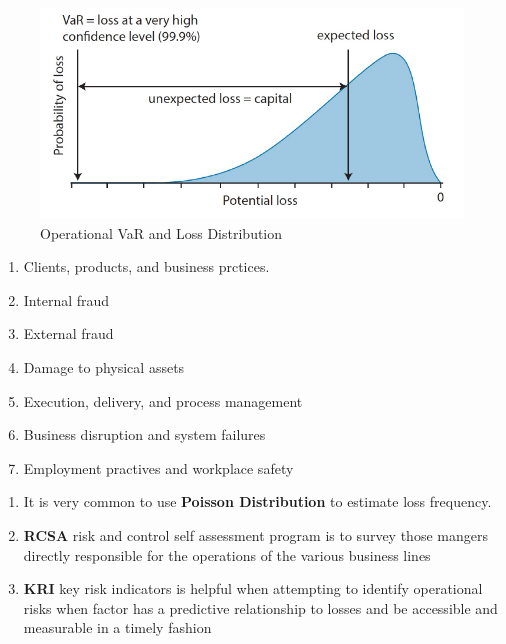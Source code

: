 \documentclass[11pt,fleqn]{book} %
\numberwithin{equation}{section} %
\numberwithin{figure}{section} %
\numberwithin{table}{section} %
\begin{document}
\begin{figure}[h!]
    \centering
    \includegraphics[scale=0.8]{AMA.png}
    \caption{Operational VaR and Loss Distribution}
\end{figure}
\begin{definition}

    \begin{enumerate}
        \item Clients, products, and business prctices.
        \item Internal fraud
        \item External fraud
        \item Damage to physical assets
        \item Execution, delivery, and process management
        \item Business disruption and system failures
        \item Employment practives and workplace safety
    \end{enumerate}
\end{definition}
\begin{remark} 
    \begin{enumerate}
        \item It is very common to use \textbf{Poisson Distribution} to estimate loss frequency.
        \item \textbf{RCSA} risk and control self assessment program is to survey those mangers directly responsible for the operations of the various business 
        lines
        \item \textbf{KRI} key risk indicators is helpful when attempting to identify operational risks when factor has a predictive relationship 
        to losses and be accessible and measurable in a timely fashion 
    \end{enumerate}
\end{remark}
\end{document}
